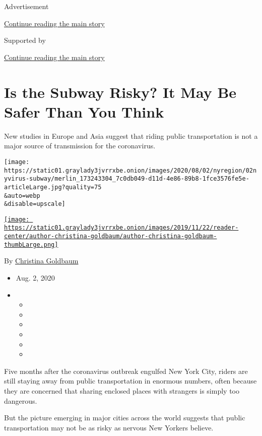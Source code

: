 Advertisement

\protect\hyperlink{after-top}{Continue reading the main story}

Supported by

\protect\hyperlink{after-sponsor}{Continue reading the main story}

\hypertarget{is-the-subway-risky-it-may-be-safer-than-you-think}{%
\section{Is the Subway Risky? It May Be Safer Than You
Think}\label{is-the-subway-risky-it-may-be-safer-than-you-think}}

New studies in Europe and Asia suggest that riding public transportation
is not a major source of transmission for the coronavirus.

\texttt{[image: https://static01.graylady3jvrrxbe.onion/images/2020/08/02/nyregion/02nyvirus-subway/merlin\_173243304\_7c0db049-d11d-4e86-89b8-1fce3576fe5e-articleLarge.jpg?quality=75\\\&auto=webp\\\&disable=upscale]}

\href{https://www.nytimes3xbfgragh.onion/by/christina-goldbaum}{\texttt{[image: https://static01.graylady3jvrrxbe.onion/images/2019/11/22/reader-center/author-christina-goldbaum/author-christina-goldbaum-thumbLarge.png]}}

By
\href{https://www.nytimes3xbfgragh.onion/by/christina-goldbaum}{Christina
Goldbaum}

\begin{itemize}
\item
  Aug. 2, 2020
\item
  \begin{itemize}
  \item
  \item
  \item
  \item
  \item
  \item
  \end{itemize}
\end{itemize}

Five months after the coronavirus outbreak engulfed New York City,
riders are still staying away from public transportation in enormous
numbers, often because they are concerned that sharing enclosed places
with strangers is simply too dangerous.

But the picture emerging in major cities across the world suggests that
public transportation may not be as risky as nervous New Yorkers
believe.

